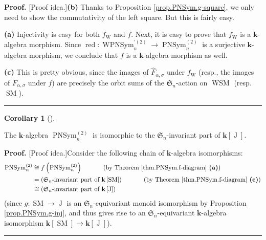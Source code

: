 \documentclass[numbers=enddot,12pt,final,onecolumn,notitlepage]{scrartcl}%
\theoremstyle{definition}
\newtheorem{coro}[theo]{Corollary}
\newenvironment{corollary}[1][]
{\begin{coro}[#1]\begin{leftbar}}
{\end{leftbar}\end{coro}}
\newenvironment{proof}[1][Proof]{\noindent\textbf{#1.} }{\ \rule{0.5em}{0.5em}}
\begin{document}
\begin{proof}
[Proof idea.]\textbf{(b)} Thanks to Proposition \ref{prop.PNSym.g-square}, we
only need to show the commutativity of the left square. But this is fairly
easy. \medskip

\textbf{(a)} Injectivity is easy for both $f_{\operatorname*{W}}$ and $f$.
Next, it is easy to prove that $f_{\operatorname*{W}}$ is a $\mathbf{k}%
$-algebra morphism. Since $\operatorname*{red}:\operatorname*{WPNSym}%
\nolimits_{n}^{\prime\left(  2\right)  }\rightarrow\operatorname*{PNSym}%
\nolimits_{n}^{\left(  2\right)  }$ is a surjective $\mathbf{k}$-algebra
morphism, we conclude that $f$ is a $\mathbf{k}$-algebra morphism as well.
\medskip

\textbf{(c)} This is pretty obvious, since the images of $\widehat{F}%
_{\alpha,\sigma}$ under $f_{\operatorname*{W}}$ (resp., the images of
$F_{\alpha,\sigma}$ under $f$) are precisely the orbit sums of the
$\mathfrak{S}_{n}$-action on $\operatorname*{WSM}$ (resp. $\operatorname*{SM}$).
\end{proof}

\begin{corollary}
\label{cor.PNSym.as-invariant-ring}The $\mathbf{k}$-algebra
$\operatorname*{PNSym}\nolimits_{n}^{\left(  2\right)  }$ is isomorphic to the
$\mathfrak{S}_{n}$-invariant part of $\mathbf{k}\left[  \operatorname*{J}%
\right]  $.
\end{corollary}

\begin{proof}
[Proof idea.]Consider the following chain of $\mathbf{k}$-algebra
isomorphisms:
\begin{align*}
\operatorname*{PNSym}\nolimits_{n}^{\left(  2\right)  }  &  \cong f\left(
\operatorname*{PNSym}\nolimits_{n}^{\left(  2\right)  }\right)
\ \ \ \ \ \ \ \ \ \ \left(  \text{by Theorem \ref{thm.PNSym.f-diagram}
\textbf{(a)}}\right) \\
&  =\left(  \mathfrak{S}_{n}\text{-invariant part of }\mathbf{k}\left[
\operatorname*{SM}\right]  \right)  \ \ \ \ \ \ \ \ \ \ \left(  \text{by
Theorem \ref{thm.PNSym.f-diagram} \textbf{(c)}}\right) \\
&  \cong\left(  \mathfrak{S}_{n}\text{-invariant part of }\mathbf{k}\left[
\operatorname*{J}\right]  \right)
\end{align*}
(since $g:\operatorname*{SM}\rightarrow\operatorname*{J}$ is an $\mathfrak{S}%
_{n}$-equivariant monoid isomorphism by Proposition \ref{prop.PNSym.g-inj},
and thus gives rise to an $\mathfrak{S}_{n}$-equivariant $\mathbf{k}$-algebra
isomorphism $\mathbf{k}\left[  \operatorname*{SM}\right]  \rightarrow
\mathbf{k}\left[  \operatorname*{J}\right]  $).
\end{proof}
\end{document}
